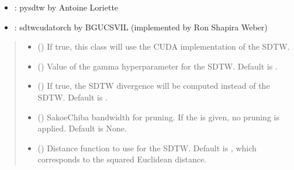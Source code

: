 \documentclass[letterpaper,10pt,english]{sphinxmanual}
\begin{document}
\begin{fulllineitems}
\begin{itemize}
\item {} 
\sphinxAtStartPar
{}: pysdtw by Antoine Loriette

\item {} 
\sphinxAtStartPar
{} : sdtw\sphinxhyphen{}cuda\sphinxhyphen{}torch by BGU\sphinxhyphen{}CS\sphinxhyphen{}VIL (implemented by Ron Shapira Weber)

\end{itemize}
\begin{quote}\begin{description}
\begin{itemize}
\item {} 
\sphinxAtStartPar
{} () \textendash{} If true, this class will use the CUDA implementation of the SDTW.

\item {} 
\sphinxAtStartPar
{} (\sphinxstyleliteralemphasis{\sphinxupquote{, }}) \textendash{} Value of the gamma hyperparameter for the SDTW. Default is .

\item {} 
\sphinxAtStartPar
{} (\sphinxstyleliteralemphasis{\sphinxupquote{, }}) \textendash{} If true, the SDTW divergence will be computed instead of the SDTW. Default is .

\item {} 
\sphinxAtStartPar
{} (\sphinxstyleliteralemphasis{\sphinxupquote{, }}) \textendash{} Sakoe\sphinxhyphen{}Chiba bandwidth for pruning. If the  is given, no pruning is applied. Default is None.

\item {} 
\sphinxAtStartPar
{} (\sphinxstyleliteralemphasis{\sphinxupquote{, }}) \textendash{} Distance function to use for the SDTW. Default is , which corresponds to the squared Euclidean distance.


\end{itemize}
\end{description}
\end{quote}
\end{fulllineitems}
\end{document}
